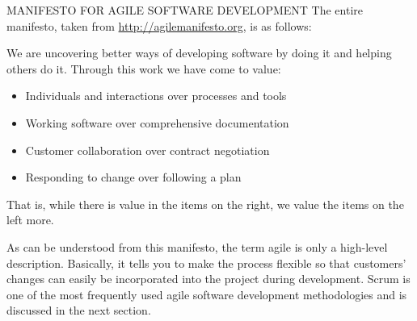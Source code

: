 \begin{myTip}{MANIFESTO FOR AGILE SOFTWARE DEVELOPMENT}
The entire manifesto, taken from \url{http://agilemanifesto.org}, is as follows:

We are uncovering better ways of developing software by doing it and helping others do it. Through this work we have come to value:

\begin{itemize}
\item
Individuals and interactions over processes and tools

\item
Working software over comprehensive documentation

\item
Customer collaboration over contract negotiation

\item
Responding to change over following a plan
\end{itemize}

That is, while there is value in the items on the right, we value the items on the left more.
\end{myTip}

As can be understood from this manifesto, the term agile is only a high-level description. Basically, it tells you to make the process flexible so that customers’ changes can easily be incorporated into the project during development. Scrum is one of the most frequently used agile software development methodologies and is discussed in the next section.


